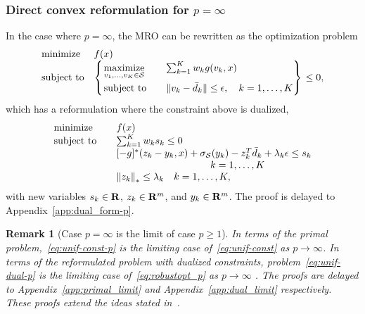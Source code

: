 \documentclass[12pt]{article}
\theoremstyle{thmstyleone}%
\theoremstyle{thmstyletwo}%
\newtheorem{remark}{Remark}%
\theoremstyle{thmstylethree}%
\begin{document}
\subsubsection{Direct convex reformulation for $p = \infty$ }
\label{sub:direct-p}
In the case where ${p = \infty}$, the \gls{MRO} can be rewritten as the optimization problem
\begin{equation}
	\label{eq:unif-const-p}
	\begin{array}{ll}
		\mbox{minimize} & f(x)\\
		\mbox{subject to} & \begin{dcases}
			\begin{rcases}
		\underset{v_1, \dots, v_K \in\mathcal{S}}{\text{maximize}} &\quad \sum_{k=1} ^K w_k g(v_k, x) \\
		\mbox{subject to} & \quad  \| v_k - \bar{d}_k \| \le \epsilon, \quad k = 1,\dots, K
			\end{rcases}
			\end{dcases} \le 0,
	\end{array}
\end{equation}
which has a reformulation where the constraint above is dualized,
	\begin{equation}
	\label{eq:unif-dual-p}
	\begin{array}{ll}
		\text{minimize} & f(x)\\
 \text{subject to} \quad & \sum_{k=1}^{K} w_k s_k \leq 0\\
&[-g]^*(z_{k} - y_{k},x) + \sigma_{{\supp}}(y_{k}) - z_{k}^T\bar{d}_k  + \lambda_k \epsilon \leq s_k\\
& \hspace{3cm} \quad k = 1,\dots, K\\
&  \left\|z_{k} \right\|_* \leq \lambda_k \quad k = 1,\dots, K,
\end{array}
\end{equation}
with new variables $s_k \in {\mathbf R}$, $z_{k} \in {\mathbf R}^m$, and $y_{k} \in {\mathbf R}^m$. The proof is delayed to Appendix~\ref{app:dual_form-p}.

\begin{remark}[Case ${p = \infty}$ is the limit of case ${p \geq 1}$]
	\label{limit-proof}
	In terms of the primal problem,~\eqref{eq:unif-const-p} is the limiting case of~\eqref{eq:unif-const} as $p \rightarrow \infty$.
	In terms of the reformulated problem with dualized constraints, problem~\eqref{eq:unif-dual-p} is the limiting case of~\eqref{eq:robustopt_p} as $p \rightarrow \infty$ .
	The proofs are delayed to Appendix~\ref{app:primal_limit} and Appendix~\ref{app:dual_limit} respectively. These proofs extend the ideas stated in~\cite[Proposition 3]{wass-p-1}.
\end{remark}
\end{document}
